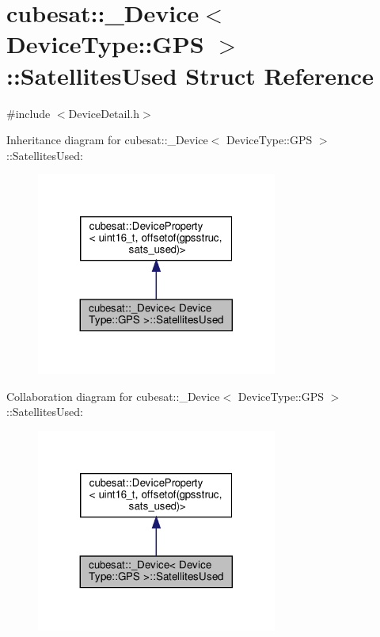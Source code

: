 \hypertarget{structcubesat_1_1__Device_3_01DeviceType_1_1GPS_01_4_1_1SatellitesUsed}{}\section{cubesat\+:\+:\+\_\+\+Device$<$ Device\+Type\+:\+:G\+PS $>$\+:\+:Satellites\+Used Struct Reference}
\label{structcubesat_1_1__Device_3_01DeviceType_1_1GPS_01_4_1_1SatellitesUsed}


{\ttfamily \#include $<$Device\+Detail.\+h$>$}



Inheritance diagram for cubesat\+:\+:\+\_\+\+Device$<$ Device\+Type\+:\+:G\+PS $>$\+:\+:Satellites\+Used\+:\nopagebreak
\begin{figure}[H]
\begin{center}
\leavevmode
\includegraphics[width=224pt]{structcubesat_1_1__Device_3_01DeviceType_1_1GPS_01_4_1_1SatellitesUsed__inherit__graph}
\end{center}
\end{figure}


Collaboration diagram for cubesat\+:\+:\+\_\+\+Device$<$ Device\+Type\+:\+:G\+PS $>$\+:\+:Satellites\+Used\+:\nopagebreak
\begin{figure}[H]
\begin{center}
\leavevmode
\includegraphics[width=224pt]{structcubesat_1_1__Device_3_01DeviceType_1_1GPS_01_4_1_1SatellitesUsed__coll__graph}
\end{center}
\end{figure}
